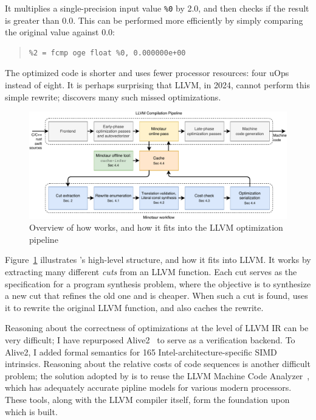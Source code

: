 It multiplies a single-precision input value \texttt{\%0} by 2.0, and
then checks if the result is greater than 0.0.
%
This can be performed more efficiently by simply comparing the
original value against 0.0:

{\begin{quote}
\begin{verbatim}
%2 = fcmp oge float %0, 0.000000e+00
\end{verbatim}
\end{quote}}

The optimized code is shorter and uses fewer processor resources: four
uOps instead of eight.
%
It is perhaps surprising that LLVM, in 2024, cannot perform this
simple rewrite; \minotaur{} discovers many such missed optimizations.


 \begin{figure}[tbp]
     \includegraphics[width=\linewidth]{figures/flowchart.pdf}
     \caption{Overview of how \minotaur{} works, and how it fits into the
       LLVM optimization pipeline}
     \label{fig:workflow}
\end{figure}

Figure~\ref{fig:workflow} illustrates \minotaur's high-level structure,
and how it fits into LLVM\@.
%
It works by extracting many different \textit{cuts} from an LLVM function.
%
Each cut serves as the specification for a program synthesis
problem, where the objective is to synthesize a new cut that refines
the old one and is cheaper.
%
When such a cut is found, \minotaur{} uses it to rewrite the original
LLVM function, and also caches the rewrite.


Reasoning about the correctness of optimizations at the level of LLVM
IR can be very difficult; I have repurposed Alive2~\cite{alive2} to
serve as a verification backend.
%
To Alive2, I added formal semantics for 165
Intel-architecture-specific SIMD intrinsics.
%
Reasoning about the relative costs of code sequences is another
difficult problem; the solution adopted by \minotaur{} is to reuse the
LLVM Machine Code Analyzer~\cite{llvmmca}, which has adequately
accurate pipline models for various modern processors.
%
These tools, along with the LLVM compiler itself, form the
foundation upon which \minotaur{} is built.


